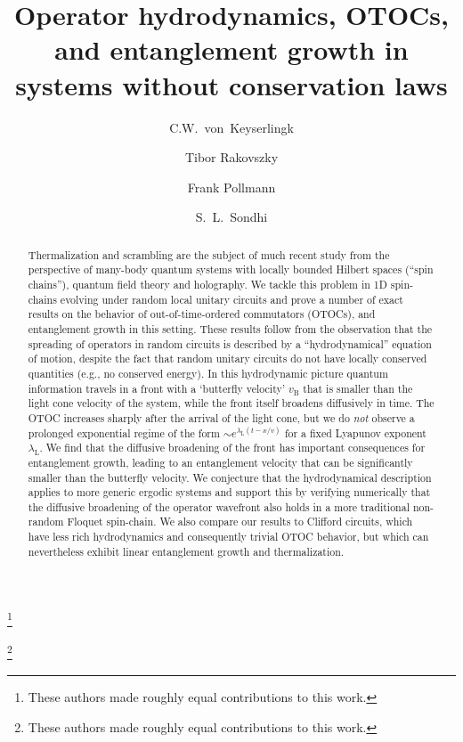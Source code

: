 \documentclass[aps,prb,twocolumn,superscriptaddress]{revtex4-1}
\begin{document}
\title{Operator hydrodynamics, OTOCs, and entanglement growth in systems without conservation laws}
\author{C.W.~von~Keyserlingk}
\thanks{These authors made roughly equal contributions to this work.}
\author{Tibor Rakovszky}
\thanks{These authors made roughly equal contributions to this work.}
\author{Frank Pollmann}
\author{S.~L.~Sondhi}
\begin{abstract}
Thermalization and scrambling are the subject of much recent study from
the perspective of many-body quantum systems with locally bounded Hilbert spaces (``spin
chains''), quantum field theory and holography. We  tackle this problem in 1D spin-chains evolving under random local unitary circuits and prove a number of exact results on the behavior of out-of-time-ordered commutators (OTOCs), and entanglement growth in this setting. These results follow from the observation that the spreading of operators in random circuits is described by a ``hydrodynamical'' equation of motion, despite the fact that random unitary circuits do not have locally conserved quantities (e.g., no conserved energy). In this hydrodynamic picture quantum information travels in a front with a `butterfly velocity' $v_{\text{B}}$ that is smaller than the light cone velocity of the system, while the front itself broadens diffusively in time. The OTOC increases sharply after the arrival of the light cone, but we do \emph{not} observe a prolonged exponential regime of the form $\sim e^{\lambda_\text{L}(t-x/v)}$ for a fixed Lyapunov exponent $\lambda_\text{L}$. We find that the diffusive broadening of the front has important consequences for entanglement growth, leading to an entanglement velocity that can be significantly smaller than the butterfly velocity. We conjecture that the hydrodynamical description applies to more generic ergodic systems and support this by verifying numerically that the diffusive broadening of the operator wavefront also holds in a more traditional non-random Floquet spin-chain. We also compare our results to Clifford circuits, which have less rich hydrodynamics and consequently trivial OTOC behavior, but which can nevertheless exhibit linear entanglement growth and thermalization.
\end{abstract}
\maketitle
\end{document}
